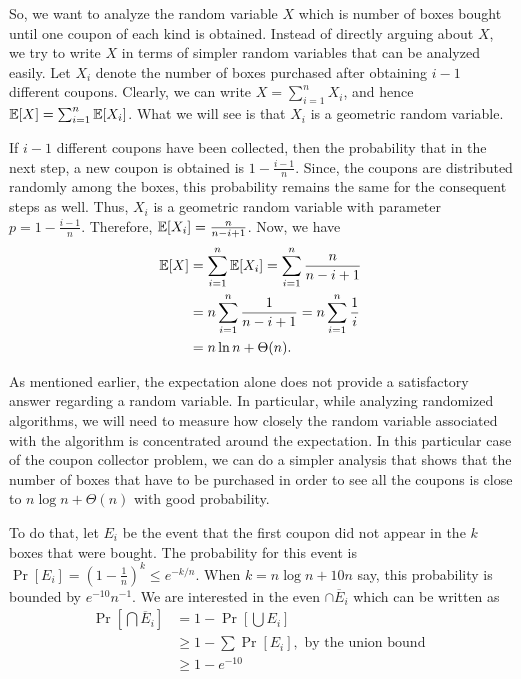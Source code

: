 So, we want to analyze the random variable $X$ which is number of boxes bought until one coupon of each kind is obtained. Instead of directly arguing about $X$, we try to write $X$ in terms of simpler random variables that can be analyzed easily. Let $X_i$ denote the number of boxes purchased after obtaining $i-1$ different coupons. Clearly, we can write $X = \sum_{i=1}^{n} X_i$, and hence $\mathbb{E}[X] = \sum_{i=1}^n \mathbb{E}[X_i]$. What we will see is that $X_i$ is a geometric random variable.

If $i-1$ different coupons have been collected, then the probability that in the next step, a new coupon is obtained is $1-\frac{i-1}{n}$. Since, the coupons are distributed randomly among the boxes, this probability remains the same for the consequent steps as well. Thus, $X_i$ is a geometric random variable with parameter $p = 1 - \frac{i-1}{n}$. Therefore, $\mathbb{E}[X_i] = \frac{n}{n-i+1}$. Now, we have
\begin{align*}
	\mathbb{E}[X] &= \sum_{i=1}^n \mathbb{E}[X_i] = \sum_{i=1}^n \frac{n}{n-i+1}\\
	&= n \sum_{i=1}^n \frac{1}{n-i+1} = n\sum_{i=1}^n \frac{1}{i}\\
	&= n\ln n+ \Theta(n).
\end{align*}

As mentioned earlier, the expectation alone does not provide a satisfactory answer regarding a random variable. In particular, while analyzing randomized algorithms, we will need to measure how closely the random variable associated with the algorithm is concentrated around the expectation. In this particular case of the coupon collector problem, we can do a simpler analysis that shows that the number of boxes that have to be purchased in order to see all the coupons is close to $n\log n + \Theta(n)$ with good probability. 

To do that, let $E_i$ be the event that the first coupon did not appear in the $k$ boxes that were bought. The probability for this event is $\Pr[E_i] = \left(  1- \frac{1}{n} \right)^k\leq e^{-k/n}$. When $k=n\log n + 10n$ say, this probability is bounded by $e^{-10}n^{-1}$. We are interested in the even $\cap \overline{E}_i$ which can be written as
\begin{align*}
	\Pr\left[\bigcap \overline{E}_i \right] &= 1 - \Pr\left[ \bigcup E_i \right]\\
	&\geq 1 - \sum \Pr[E_i], \text{ by the union bound }\\
	&\geq 1 - e^{-10}
\end{align*}

